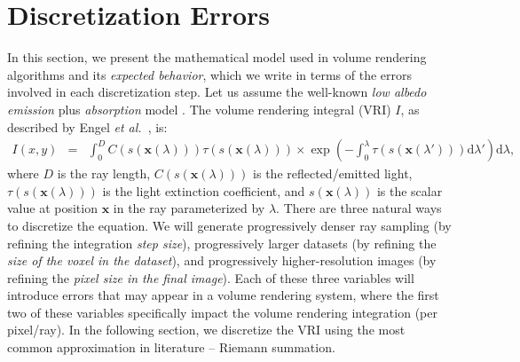 

\section{Discretization Errors}
\label{sec:volume-rendering}

In this section, we present the mathematical model used in volume
rendering algorithms and its \emph{expected behavior}, which we write
in terms of the errors involved in each discretization step.  Let us
assume the well-known \emph{low albedo} \emph{emission} plus
\emph{absorption} model \cite{Max95}.  The volume rendering integral
(VRI) $I$, as described by Engel \emph{et al.}~\cite{Engel01}, is:
\begin{eqnarray}
I(x,y) &=& \int_0^D C(s(\mathbf{x}(\lambda)))
\tau(s(\mathbf{x}(\lambda))) \times \exp\left(-\int_0^\lambda
\tau(s(\mathbf{x}(\lambda'))) \mathrm{d}\lambda'\right)\mathrm{d}\lambda,
\label{eq:volume-rendering-equation}
\end{eqnarray}
where $D$ is the ray length, $C(s(\mathbf{x}(\lambda)))$ is the
reflected/emitted light, $\tau(s(\mathbf{x}(\lambda)))$ is the light
extinction coefficient, and $s(\mathbf{x}(\lambda))$ is the scalar value
at position $\mathbf{x}$ in the ray parameterized by $\lambda$.  There
are three natural ways to discretize the equation. We will generate
progressively denser ray sampling (by refining the integration
\emph{step size}), progressively larger datasets (by refining the
\emph{size of the voxel in the dataset}), and progressively
higher-resolution images (by refining the \emph{pixel size in the
  final image}). Each of these three variables will introduce errors
that may appear in a volume rendering system, where the first two of these
variables specifically impact the volume rendering integration (per pixel/ray).
In the following section, we discretize the VRI using
the most common approximation in literature -- Riemann summation.

